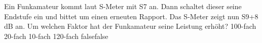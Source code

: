     {Ein Funkamateur kommt laut S-Meter mit S7 an. Dann schaltet dieser seine Endstufe ein und bittet um einen erneuten Rapport. Das S-Meter zeigt nun S9+8 dB an. Um welchen Faktor hat der Funkamateur seine Leistung erhöht?}
    {100-fach}
    {20-fach}
    {10-fach}
    {120-fach}
    {false}{false}